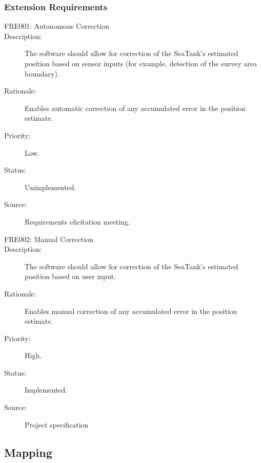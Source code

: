 \documentclass[12pt]{article}
\begin{document}
\subsubsection{Extension Requirements}
\begin{description}
\item [{FRE001: Autonomous Correction}\label{FRE001}] 
\item [{Description: }\label{Description}] The software should allow for correction of the SeaTank's estimated position based on sensor inputs (for example, detection of the survey area boundary). 
\item[{Rationale: }\label{Rationale}] Enables automatic correction of any accumulated error in the position estimate.
\item[{Priority: }\label{Priority}] Low.
\item[{Status: }\label{Status}] Unimplemented.
\item[{Source: }\label{Source}] Requirements elicitation meeting.

\item [{FRE002: Manual Correction}\label{FRE002}]
\item [{Description: }\label{Description}] The software should allow for correction of the SeaTank's estimated position based on user input. \\
\item[{Rationale: }\label{Rationale}] Enables manual correction of any accumulated error in the position estimate.
\item[{Priority: }\label{Priority}] High.
\item[{Status: }\label{Status}] Implemented.
\item[{Source: }\label{Source}] Project specification \cite{spec}

\end{description}

\subsection{Mapping}
\end{document}
